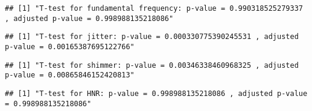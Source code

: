 \documentclass[
]{article}
\newenvironment{Shaded}{\begin{snugshade}}{\end{snugshade}}
\newcommand{\DecValTok}[1]{\textcolor[rgb]{0.00,0.00,0.81}{#1}}
\newcommand{\FunctionTok}[1]{\textcolor[rgb]{0.00,0.00,0.00}{#1}}
\newcommand{\NormalTok}[1]{#1}
\newcommand{\SpecialCharTok}[1]{\textcolor[rgb]{0.00,0.00,0.00}{#1}}
\newcommand{\StringTok}[1]{\textcolor[rgb]{0.31,0.60,0.02}{#1}}
\begin{document}
\begin{verbatim}
## [1] "T-test for fundamental frequency: p-value = 0.990318525279337 , adjusted p-value = 0.998988135218086"
\end{verbatim}

\begin{Shaded}
\end{Shaded}

\begin{verbatim}
## [1] "T-test for jitter: p-value = 0.000330775390245531 , adjusted p-value = 0.00165387695122766"
\end{verbatim}

\begin{Shaded}
\end{Shaded}

\begin{verbatim}
## [1] "T-test for shimmer: p-value = 0.00346338460968325 , adjusted p-value = 0.00865846152420813"
\end{verbatim}

\begin{Shaded}
\end{Shaded}

\begin{verbatim}
## [1] "T-test for HNR: p-value = 0.998988135218086 , adjusted p-value = 0.998988135218086"
\end{verbatim}
\end{document}
